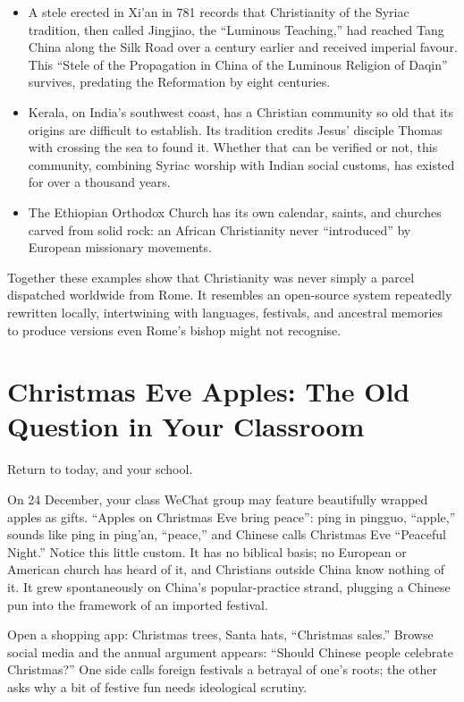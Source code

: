 \begin{itemize}
\item A stele erected in Xi'an in 781 records that Christianity of the Syriac tradition, then called Jingjiao, the ``Luminous Teaching,'' had reached Tang China along the Silk Road over a century earlier and received imperial favour. This ``Stele of the Propagation in China of the Luminous Religion of Daqin'' survives, predating the Reformation by eight centuries.
\item Kerala, on India's southwest coast, has a Christian community so old that its origins are difficult to establish. Its tradition credits Jesus' disciple Thomas with crossing the sea to found it. Whether that can be verified or not, this community, combining Syriac worship with Indian social customs, has existed for over a thousand years.
\item The Ethiopian Orthodox Church has its own calendar, saints, and churches carved from solid rock: an African Christianity never ``introduced'' by European missionary movements.
\end{itemize}
Together these examples show that Christianity was never simply a parcel dispatched worldwide from Rome. It resembles an open-source system repeatedly rewritten locally, intertwining with languages, festivals, and ancestral memories to produce versions even Rome's bishop might not recognise.

\section[Christmas Eve Apples]{Christmas Eve Apples: The Old Question in Your Classroom}
Return to today, and your school.

On 24 December, your class WeChat group may feature beautifully wrapped apples as gifts. ``Apples on Christmas Eve bring peace'': ping in pingguo, ``apple,'' sounds like ping in ping'an, ``peace,'' and Chinese calls Christmas Eve ``Peaceful Night.'' Notice this little custom. It has no biblical basis; no European or American church has heard of it, and Christians outside China know nothing of it. It grew spontaneously on China's popular-practice strand, plugging a Chinese pun into the framework of an imported festival.

Open a shopping app: Christmas trees, Santa hats, ``Christmas sales.'' Browse social media and the annual argument appears: ``Should Chinese people celebrate Christmas?'' One side calls foreign festivals a betrayal of one's roots; the other asks why a bit of festive fun needs ideological scrutiny.

